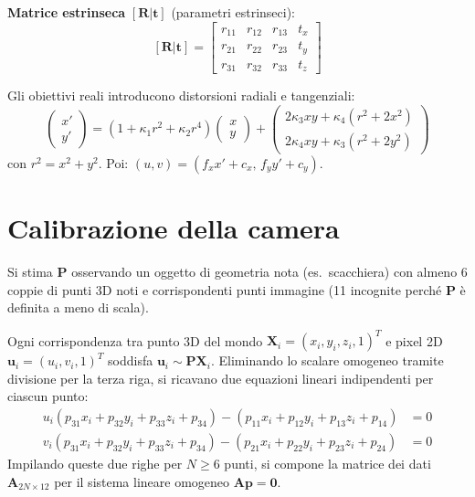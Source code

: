 \documentclass[12pt, a4paper]{report}
\begin{document}
\textbf{Matrice estrinseca} $[\mathbf{R}|\mathbf{t}]$ (parametri estrinseci):
\[
  [\mathbf{R}|\mathbf{t}]=\begin{bmatrix}r_{11}&r_{12}&r_{13}&t_x\\r_{21}&r_{22}&r_{23}&t_y\\r_{31}&r_{32}&r_{33}&t_z\end{bmatrix}
\]

\begin{notebox}
Gli obiettivi reali introducono distorsioni radiali e tangenziali:
\[
  \begin{pmatrix}x'\\y'\end{pmatrix}=
  (1+\kappa_1r^2+\kappa_2r^4)\begin{pmatrix}x\\y\end{pmatrix}+
  \begin{pmatrix}2\kappa_3xy+\kappa_4(r^2+2x^2)\\2\kappa_4xy+\kappa_3(r^2+2y^2)\end{pmatrix}
\]
con $r^2=x^2+y^2$. Poi: $(u,v)=(f_x x'+c_x,\,f_y y'+c_y)$.
\end{notebox}

\section{Calibrazione della camera}

Si stima $\mathbf{P}$ osservando un oggetto di geometria nota (es.\ scacchiera)
con almeno 6 coppie di punti 3D noti e corrispondenti punti immagine (11 incognite
perché $\mathbf{P}$ è definita a meno di scala).

\begin{defbox}
Ogni corrispondenza tra punto 3D del mondo $\mathbf{X}_i = (x_i, y_i, z_i, 1)^T$ e pixel 2D $\mathbf{u}_i = (u_i, v_i, 1)^T$ soddisfa $\mathbf{u}_i \sim \mathbf{P} \mathbf{X}_i$. Eliminando lo scalare omogeneo tramite divisione per la terza riga, si ricavano due equazioni lineari indipendenti per ciascun punto:
\[
  \begin{aligned}
    u_i (p_{31} x_i + p_{32} y_i + p_{33} z_i + p_{34}) - (p_{11} x_i + p_{12} y_i + p_{13} z_i + p_{14}) &= 0 \\
    v_i (p_{31} x_i + p_{32} y_i + p_{33} z_i + p_{34}) - (p_{21} x_i + p_{22} y_i + p_{23} z_i + p_{24}) &= 0
  \end{aligned}
\]
Impilando queste due righe per $N \ge 6$ punti, si compone la matrice dei dati $\mathbf{A}_{2N \times 12}$ per il sistema lineare omogeneo $\mathbf{A}\mathbf{p} = \mathbf{0}$.
\end{defbox}
\end{document}
